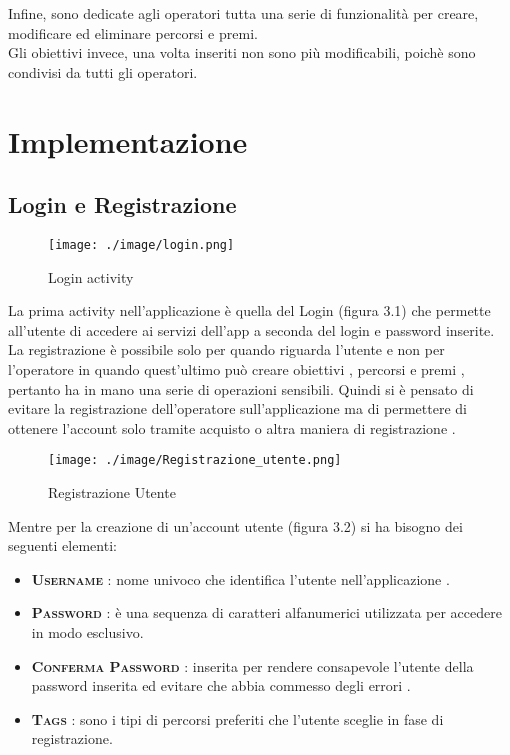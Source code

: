 Infine, sono dedicate agli operatori tutta una serie di funzionalità per creare, modificare ed eliminare percorsi e premi.\\
Gli obiettivi invece, una volta inseriti non sono più modificabili, poichè sono condivisi da tutti gli operatori.




\chapter{Implementazione}

\section{Login e Registrazione}

\vspace{2em}

\begin{wrapfigure}{L}{0.45\textwidth}
\centering
\texttt{[image: ./image/login.png]}
\caption{\label{fig:login}Login activity}
\end{wrapfigure}

La prima activity nell'applicazione è quella del Login (figura 3.1) che permette all'utente di accedere ai servizi dell'app a seconda del login e password inserite.
La registrazione è possibile solo per quando riguarda l'utente e non per l'operatore in quando quest'ultimo può creare obiettivi , percorsi e premi , pertanto ha in mano una serie di operazioni sensibili.
Quindi si è pensato di evitare la registrazione dell'operatore sull'applicazione ma di permettere di ottenere l'account solo tramite acquisto o altra maniera di registrazione .

\begin{wrapfigure}{R}{0.45\textwidth}
\centering
\texttt{[image: ./image/Registrazione\_utente.png]}
\caption{\label{fig:login}Registrazione Utente}
\end{wrapfigure}

Mentre per la creazione di un'account utente (figura 3.2) si ha bisogno dei seguenti elementi:

\begin{itemize}  

\item \textsc{\bfseries Username} : nome univoco che identifica l'utente nell'applicazione .
\item \textsc{\bfseries Password} : è una sequenza di caratteri alfanumerici utilizzata per accedere in modo esclusivo. 
\item \textsc{\bfseries Conferma Password} : inserita per rendere consapevole l'utente della password inserita ed evitare che abbia commesso degli errori .
\item \textsc{\bfseries Tags} : sono i tipi di percorsi preferiti che l'utente sceglie in fase di registrazione.\\

\end{itemize}

